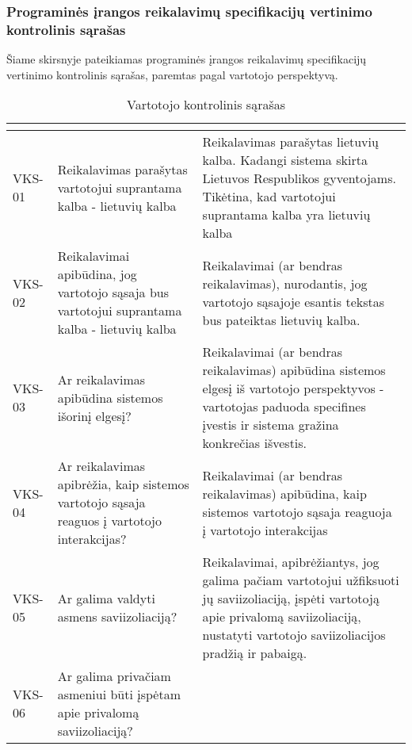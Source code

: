 \documentclass{VUMIFPSkursinis}
\begin{document}
			\subsubsection{Programinės įrangos reikalavimų specifikacijų vertinimo kontrolinis sąrašas}
Šiame skirsnyje pateikiamas programinės įrangos reikalavimų specifikacijų vertinimo kontrolinis sąrašas, paremtas pagal vartotojo perspektyvą.
			\begin{center}

				\begin{longtable}{|C{2cm}|L{5cm}|L{8cm}|}

					\caption{Vartotojo kontrolinis sąrašas}
					\label{table:VKS}

 					\\ \hline
 					 &
  					 & 
 					\\ \hline
 					VKS-01 &
 					Reikalavimas parašytas vartotojui suprantama kalba - lietuvių kalba& 
 					Reikalavimas parašytas lietuvių kalba. Kadangi sistema skirta Lietuvos Respublikos gyventojams. Tikėtina, kad vartotojui suprantama kalba yra lietuvių kalba\\ \hline
 					VKS-02 &
 					Reikalavimai apibūdina, jog vartotojo sąsaja bus vartotojui suprantama kalba - lietuvių kalba&
 					Reikalavimai (ar bendras reikalavimas), nurodantis, jog vartotojo sąsajoje esantis tekstas bus pateiktas lietuvių kalba.\\ \hline
 					VKS-03 &
 					Ar reikalavimas apibūdina sistemos išorinį elgesį? & 
					Reikalavimai (ar bendras reikalavimas) apibūdina sistemos elgesį iš vartotojo perspektyvos - vartotojas paduoda specifines įvestis ir sistema gražina konkrečias išvestis.\\ \hline  
 					VKS-04 &
 					Ar reikalavimas apibrėžia, kaip sistemos vartotojo sąsaja reaguos į vartotojo interakcijas?& 
 					Reikalavimai (ar bendras reikalavimas) apibūdina, kaip sistemos vartotojo sąsaja reaguoja į vartotojo interakcijas\\ \hline    
 					VKS-05 &
 					Ar galima valdyti asmens saviizoliaciją?& 
 					Reikalavimai, apibrėžiantys, jog galima pačiam vartotojui užfiksuoti jų saviizoliaciją, įspėti vartotoją apie privalomą saviizoliaciją, nustatyti vartotojo saviizoliacijos pradžią ir pabaigą.\\ \hline  
 					VKS-06 &
 					Ar galima privačiam asmeniui būti įspėtam apie privalomą saviizoliaciją?& 

\end{longtable}
\end{center}
\end{document}
